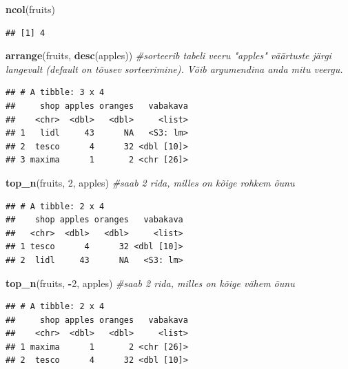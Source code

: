 \documentclass[]{book}
\newenvironment{Shaded}{\begin{snugshade}}{\end{snugshade}}
\newcommand{\KeywordTok}[1]{\textcolor[rgb]{0.13,0.29,0.53}{\textbf{#1}}}
\newcommand{\DecValTok}[1]{\textcolor[rgb]{0.00,0.00,0.81}{#1}}
\newcommand{\CommentTok}[1]{\textcolor[rgb]{0.56,0.35,0.01}{\textit{#1}}}
\newcommand{\OperatorTok}[1]{\textcolor[rgb]{0.81,0.36,0.00}{\textbf{#1}}}
\newcommand{\NormalTok}[1]{#1}
\begin{document}
\begin{Shaded}
\begin{Highlighting}[]
\KeywordTok{ncol}\NormalTok{(fruits)}
\end{Highlighting}
\end{Shaded}

\begin{verbatim}
## [1] 4
\end{verbatim}

\begin{Shaded}
\begin{Highlighting}[]
\KeywordTok{arrange}\NormalTok{(fruits, }\KeywordTok{desc}\NormalTok{(apples)) }\CommentTok{#sorteerib tabeli veeru "apples" väärtuste järgi langevalt (default on tõusev sorteerimine). Võib argumendina anda mitu veergu.}
\end{Highlighting}
\end{Shaded}

\begin{verbatim}
## # A tibble: 3 x 4
##     shop apples oranges   vabakava
##    <chr>  <dbl>   <dbl>     <list>
## 1   lidl     43      NA   <S3: lm>
## 2  tesco      4      32 <dbl [10]>
## 3 maxima      1       2 <chr [26]>
\end{verbatim}

\begin{Shaded}
\begin{Highlighting}[]
\KeywordTok{top_n}\NormalTok{(fruits, }\DecValTok{2}\NormalTok{, apples) }\CommentTok{#saab 2 rida, milles on kõige rohkem õunu}
\end{Highlighting}
\end{Shaded}

\begin{verbatim}
## # A tibble: 2 x 4
##    shop apples oranges   vabakava
##   <chr>  <dbl>   <dbl>     <list>
## 1 tesco      4      32 <dbl [10]>
## 2  lidl     43      NA   <S3: lm>
\end{verbatim}

\begin{Shaded}
\begin{Highlighting}[]
\KeywordTok{top_n}\NormalTok{(fruits, }\OperatorTok{-}\DecValTok{2}\NormalTok{, apples) }\CommentTok{#saab 2 rida, milles on kõige vähem õunu}
\end{Highlighting}
\end{Shaded}

\begin{verbatim}
## # A tibble: 2 x 4
##     shop apples oranges   vabakava
##    <chr>  <dbl>   <dbl>     <list>
## 1 maxima      1       2 <chr [26]>
## 2  tesco      4      32 <dbl [10]>
\end{verbatim}
\end{document}
